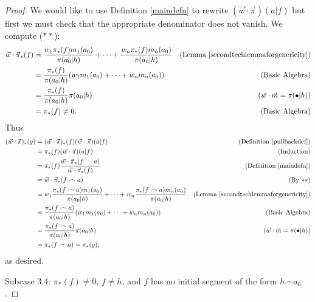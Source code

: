 \documentclass[runningheads]{llncs}
\begin{document}
\begin{proof}
    We would like to use Definition \ref{maindefn} to rewrite
    $(\vec w\cdot\vec\pi)(a|f)$ but first we must
    check that the appropriate denominator does not vanish. We compute ($**$):
    \begin{align*}
        \vec w\cdot\vec\pi_*(f)
            &= \frac{w_1\pi_*(f)m_1(a_0)}{\pi(a_0|h)}
                + \cdots +
                \frac{w_n\pi_*(f)m_n(a_0)}{\pi(a_0|h)}
                    &\mbox{(Lemma \ref{secondtechlemmaforgenericity})}\\
            &= \frac{\pi_*(f)}{\pi(a_0|h)}
                (w_1m_1(a_0) + \cdots + w_nm_n(a_0))
                    &\mbox{(Basic Algebra)}\\
            &= \frac{\pi_*(f)}{\pi(a_0|h)}\pi(a_0|h)
                    &\mbox{($\vec w\cdot\vec m=\pi(\bullet|h)$)}\\
            &= \pi_*(f)\not=0.
                    &\mbox{(Basic Algebra)}
    \end{align*}
    Thus
    \begin{align*}
        (\vec w\cdot\vec\pi)_*(g)
            &= (\vec w\cdot\vec\pi)_*(f)
                (\vec w\cdot\vec\pi)(a|f)
                    &\mbox{(Definition \ref{pullbackdef})}\\
            &= \pi_*(f)(\vec w\cdot\vec\pi)(a|f)
                    &\mbox{(Induction)}\\
            &= \pi_*(f)\frac{\vec w\cdot\vec\pi_*(f\frown a)}
                {\vec w\cdot\vec\pi_*(f)}
                    &\mbox{(Definition \ref{maindefn})}\\
            &= \vec w\cdot\vec\pi_*(f\frown a)
                    &\mbox{(By $**$)}\\
            &= w_1\frac{\pi_*(f\frown a)m_1(a_0)}{\pi(a_0|h)}
                +\cdots+w_n\frac{\pi_*(f\frown a)m_n(a_0)}{\pi(a_0|h)}
                    &\mbox{(Lemma \ref{secondtechlemmaforgenericity})}\\
            &= \frac{\pi_*(f\frown a)}{\pi(a_0|h)}(w_1m_1(a_0)+\cdots+w_nm_n(a_0))
                    &\mbox{(Basic Algebra)}\\
            &= \frac{\pi_*(f\frown a)}{\pi(a_0|h)}\pi(a_0|h)
                    &\mbox{($\vec w\cdot\vec m=\pi(\bullet|h)$)}\\
            &= \pi_*(f\frown a) = \pi_*(g),
    \end{align*}
    as desired.

    Subcase 3.4: $\pi_*(f)\not=0$, $f\not=h$, and $f$ has no initial segment
        of the form $h\frown a_0$.


\end{proof}
\end{document}
